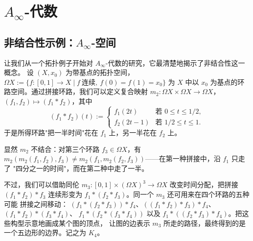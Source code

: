 \section{$A_\infty$-代数}\label{ch:01}


\subsection{非结合性示例：$A_\infty$-空间}\label{sec:1.1}

让我们从一个拓扑例子开始对 $A_\infty$-代数的研究，它最清楚地揭示了非结合性这一概念。
设 $(X,x_0)$ 为带基点的拓扑空间，
$\Omega X:=\{f:[0,1]\to X\mid f\ \text{连续},\ f(0)=f(1)=x_0\}$
为 $X$ 中以 $x_0$ 为基点的环路空间。通过拼接环路，我们可以定义复合映射
$m_2:\Omega X\times\Omega X\to\Omega X$，$(f_1,f_2)\mapsto(f_1*f_2)$，其中
\[
  (f_1*f_2)(t):=
  \begin{cases}
    f_1(2t) & \text{若 } 0\le t\le 1/2,\\
    f_2(2t-1) & \text{若 } 1/2\le t\le 1 .
  \end{cases}
\]
于是所得环路"把一半时间"花在 $f_1$ 上，另一半花在 $f_2$ 上。

显然 $m_2$ 不结合：对第三个环路 $f_3\in\Omega X$，有
$m_2(m_2(f_1,f_2),f_3)\neq m_2(f_1,m_2(f_2,f_3))$——在第一种拼接中，沿 $f_1$ 只走了
"四分之一的时间"，而在第二种中走了一半。

不过，我们可以借助同伦 $m_3:[0,1]\times(\Omega X)^3\to\Omega X$ 改变时间分配，把拼接
$(f_1*f_2)*f_3$ 连续形变为 $f_1*(f_2*f_3)$。同一个 $m_3$ 还可用来在四个环路的五种可能
拼接之间移动：
$(f_1*(f_2*f_3))*f_4$、$((f_1*f_2)*f_3)*f_4$、$(f_1*f_2)*(f_3*f_4)$、
$f_1*(f_2*(f_3*f_4))$ 以及 $f_1*((f_2*f_3)*f_4)$。把这些构型示意地画成某个图的顶点，
让图的边表示 $m_3$ 所走的路径，最终得到的是一个五边形的边界。记之为 $K_4$。

